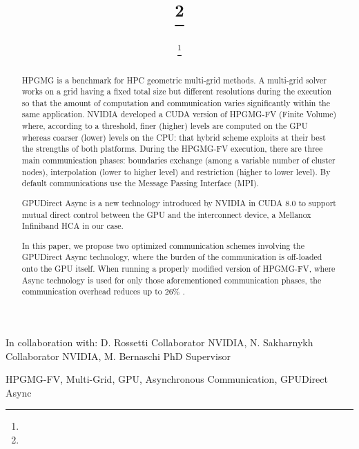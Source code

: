 \documentclass[review]{siamart1116}
\author{\TheName\thanks{\TheAddress}}
\title{{\TheTitle}\thanks{\TheFunding}}
\newcommand{\TheCollaborators}{%
D. Rossetti Collaborator NVIDIA,
N. Sakharnykh Collaborator NVIDIA,
M. Bernaschi PhD Supervisor
}
\begin{document}
\maketitle

\begin{center}
In collaboration with:
  {\TheCollaborators}
\end{center}
\vspace{1cm}

\begin{abstract}
HPGMG is a benchmark for HPC geometric multi-grid methods.
%
A multi-grid solver works on a grid having a fixed total size but
different resolutions during the execution so that the amount of computation and
communication varies significantly within the same application.
%
NVIDIA developed a CUDA version of HPGMG-FV (Finite Volume) where,
according to a threshold, finer (higher) levels are computed on the GPU
whereas coarser (lower) levels on the CPU: that hybrid scheme exploits
at their best the strengths of both platforms.
%
During the HPGMG-FV execution, there are three main communication
phases: boundaries exchange (among a variable number of cluster nodes),
interpolation (lower to higher level) and restriction (higher to lower
level). By default communications use the Message Passing Interface (MPI).

GPUDirect Async is a new technology introduced by NVIDIA in CUDA 8.0
to support mutual direct control between the GPU and the interconnect device, a
Mellanox Infiniband HCA in our case.

In this paper, we propose two optimized communication schemes involving the
GPUDirect Async technology, where the burden of the communication is
off-loaded onto the GPU itself.
%
When running a properly modified version of HPGMG-FV, where Async
technology is used for only those aforementioned communication phases,
the communication overhead reduces up to 26\% .

\end{abstract}

\begin{keywords}
  HPGMG-FV, Multi-Grid, GPU, Asynchronous Communication, GPUDirect Async
\end{keywords}
\end{document}
